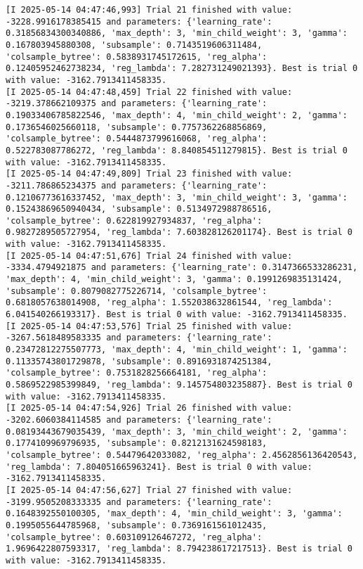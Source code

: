 \documentclass[
  letterpaper,
  DIV=11,
  numbers=noendperiod]{scrreprt}
\begin{document}
\begin{verbatim}
[I 2025-05-14 04:47:46,993] Trial 21 finished with value: -3228.9916178385415 and parameters: {'learning_rate': 0.31856834300340886, 'max_depth': 3, 'min_child_weight': 3, 'gamma': 0.167803945880308, 'subsample': 0.7143519606311484, 'colsample_bytree': 0.5838931745172615, 'reg_alpha': 0.12405952462738234, 'reg_lambda': 7.282731249021393}. Best is trial 0 with value: -3162.7913411458335.
[I 2025-05-14 04:47:48,459] Trial 22 finished with value: -3219.378662109375 and parameters: {'learning_rate': 0.19033406785822546, 'max_depth': 4, 'min_child_weight': 2, 'gamma': 0.1736546025660118, 'subsample': 0.7757362268856869, 'colsample_bytree': 0.5444873799616068, 'reg_alpha': 0.522783087786272, 'reg_lambda': 8.840854511279815}. Best is trial 0 with value: -3162.7913411458335.
[I 2025-05-14 04:47:49,809] Trial 23 finished with value: -3211.786865234375 and parameters: {'learning_rate': 0.12106773616337452, 'max_depth': 3, 'min_child_weight': 3, 'gamma': 0.15243869650940434, 'subsample': 0.5134972988786516, 'colsample_bytree': 0.622819927934837, 'reg_alpha': 0.9827289505727954, 'reg_lambda': 7.603828126201174}. Best is trial 0 with value: -3162.7913411458335.
[I 2025-05-14 04:47:51,676] Trial 24 finished with value: -3334.4794921875 and parameters: {'learning_rate': 0.3147366533286231, 'max_depth': 4, 'min_child_weight': 3, 'gamma': 0.1991269835131424, 'subsample': 0.8079082775226714, 'colsample_bytree': 0.6818057638014908, 'reg_alpha': 1.552038632861544, 'reg_lambda': 6.041540266193317}. Best is trial 0 with value: -3162.7913411458335.
[I 2025-05-14 04:47:53,576] Trial 25 finished with value: -3267.5618489583335 and parameters: {'learning_rate': 0.23472812275507773, 'max_depth': 4, 'min_child_weight': 1, 'gamma': 0.11335743801729878, 'subsample': 0.8916931874251384, 'colsample_bytree': 0.7531828256664181, 'reg_alpha': 0.5869522985399849, 'reg_lambda': 9.145754803235887}. Best is trial 0 with value: -3162.7913411458335.
[I 2025-05-14 04:47:54,926] Trial 26 finished with value: -3202.6060384114585 and parameters: {'learning_rate': 0.08193443679035439, 'max_depth': 3, 'min_child_weight': 2, 'gamma': 0.1774109969796935, 'subsample': 0.8212131624598183, 'colsample_bytree': 0.54479642033082, 'reg_alpha': 2.4562856136420543, 'reg_lambda': 7.804051665963241}. Best is trial 0 with value: -3162.7913411458335.
[I 2025-05-14 04:47:56,627] Trial 27 finished with value: -3199.9505208333335 and parameters: {'learning_rate': 0.1648392550100305, 'max_depth': 4, 'min_child_weight': 3, 'gamma': 0.1995055644785968, 'subsample': 0.7369161561012435, 'colsample_bytree': 0.603109126467272, 'reg_alpha': 1.9696422807593317, 'reg_lambda': 8.794238617217513}. Best is trial 0 with value: -3162.7913411458335.

\end{verbatim}
\end{document}

